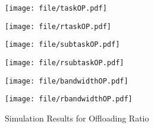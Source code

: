 \documentclass[10pt, conference, letterpaper]{IEEEtran}
\begin{document}
\begin{figure}[t]
    \centering
    \vspace{-0.35cm} %
	\subfigtopskip=2pt %
	\subfigbottomskip=1pt %
	\subfigcapskip=-5pt %
	\begin{minipage}[t]{0.48\linewidth}
		\texttt{[image: file/taskOP.pdf]}
		\label{fig_taskOP}
	\end{minipage}
	\begin{minipage}[t]{0.48\linewidth}
		\centering
		\texttt{[image: file/rtaskOP.pdf]}
		\label{fig_rtaskOP}
	\end{minipage}\vspace{1pt}
    
	\begin{minipage}[t]{0.48\linewidth}
		\texttt{[image: file/subtaskOP.pdf]}
		\label{fig_subtaskOP}
	\end{minipage}
	\begin{minipage}[t]{0.48\linewidth}
		\centering
		\texttt{[image: file/rsubtaskOP.pdf]}
		\label{fig_rsubtaskOP}
	\end{minipage}\vspace{-10pt}
    
	\begin{minipage}[t]{0.48\linewidth}
		\centering
		\texttt{[image: file/bandwidthOP.pdf]}
		\label{fig_bandwidthOP}
	\end{minipage}
	\begin{minipage}[t]{0.48\linewidth}
		\centering
		\texttt{[image: file/rbandwidthOP.pdf]}
		\label{fig_rbandwidthOP}
	\end{minipage}\vspace{-10pt}
	\centering
	
    \caption{Simulation Results for Offloading Ratio}
    \label{fig_or}
\end{figure}
\end{document}
